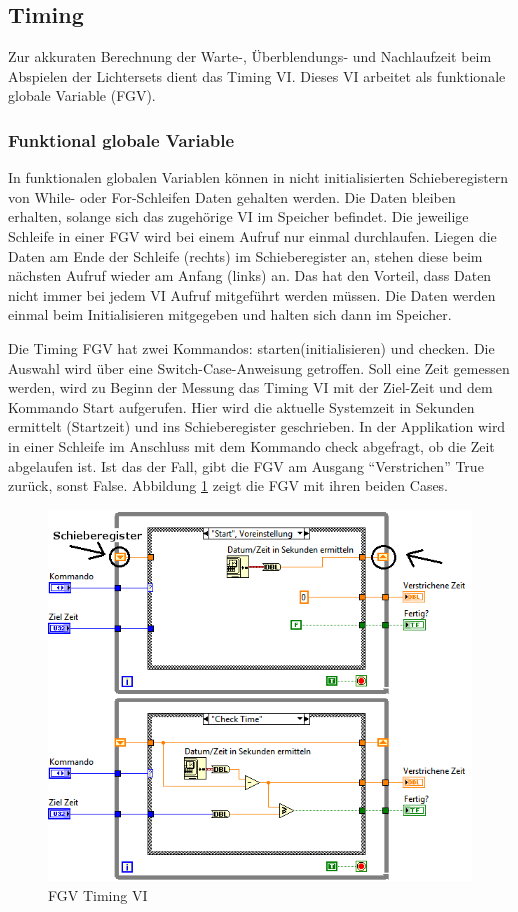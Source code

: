 	
\subsection{Timing}
Zur akkuraten Berechnung der Warte-, Überblendungs- und Nachlaufzeit beim Abspielen der Lichtersets dient das Timing VI. 
Dieses VI arbeitet als funktionale globale Variable (FGV).

\subsubsection{Funktional globale Variable}
In funktionalen globalen Variablen  können in nicht initialisierten Schieberegistern von While- oder For-Schleifen Daten gehalten werden. 
Die Daten bleiben erhalten, solange sich das zugehörige VI im Speicher befindet. Die jeweilige Schleife in einer FGV wird bei einem Aufruf nur einmal durchlaufen. 
Liegen die Daten am Ende der Schleife (rechts) im Schieberegister an, stehen diese beim nächsten Aufruf wieder am Anfang (links) an. 
Das hat den Vorteil, dass Daten nicht immer bei jedem VI Aufruf mitgeführt werden müssen. 
Die Daten werden einmal beim Initialisieren mitgegeben und halten sich dann im Speicher. \cite{LabViewHilfe}

Die Timing FGV hat zwei Kommandos: starten(initialisieren) und checken. 
Die Auswahl wird über eine Switch-Case-Anweisung getroffen. Soll eine Zeit gemessen werden, 
wird zu Beginn der Messung das Timing VI mit der Ziel-Zeit und dem Kommando Start aufgerufen. 
Hier wird die aktuelle Systemzeit in Sekunden ermittelt (Startzeit) und ins Schieberegister geschrieben. 
In der Applikation wird in einer Schleife im Anschluss mit dem Kommando check abgefragt, ob die Zeit abgelaufen ist. 
Ist das der Fall, gibt die FGV am Ausgang "`Verstrichen"' True zurück, sonst False. 
Abbildung \ref{fig:timing} zeigt die FGV mit ihren beiden Cases. 

	\begin{figure}[h!]
	\centering
		\includegraphics[width=\textwidth]{Pics/timing.png}
	\caption{FGV Timing VI}
	\label{fig:timing}
	\end{figure}


